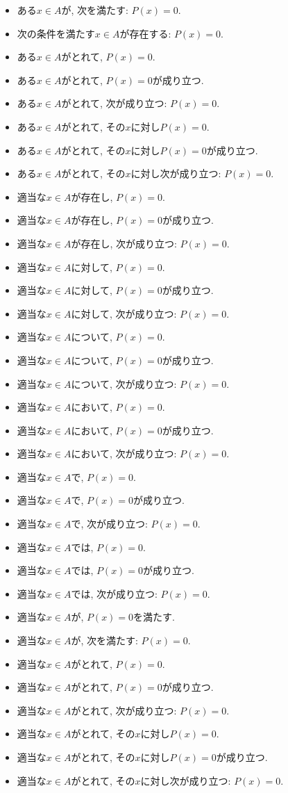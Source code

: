 \documentclass[a4paper,12pt,draft]{amsart}
\newcommand{\PPP}[1]{P(#1)=0}
\begin{document}
\begin{itemize}
\item ある$x\in A$が, 次を満たす: $\PPP{x}$.
\item 次の条件を満たす$x\in A$が存在する: $\PPP{x}$.
\item ある$x\in A$がとれて, $\PPP{x}$.
\item ある$x\in A$がとれて, $\PPP{x}$が成り立つ.
\item ある$x\in A$がとれて, 次が成り立つ: $\PPP{x}$.
\item ある$x\in A$がとれて, その$x$に対し$\PPP{x}$.
\item ある$x\in A$がとれて, その$x$に対し$\PPP{x}$が成り立つ.
\item ある$x\in A$がとれて, その$x$に対し次が成り立つ: $\PPP{x}$.
\item 適当な$x\in A$が存在し, $\PPP{x}$.
\item 適当な$x\in A$が存在し, $\PPP{x}$が成り立つ.
\item 適当な$x\in A$が存在し, 次が成り立つ: $\PPP{x}$.
\item 適当な$x\in A$に対して, $\PPP{x}$.
\item 適当な$x\in A$に対して, $\PPP{x}$が成り立つ.
\item 適当な$x\in A$に対して, 次が成り立つ: $\PPP{x}$.
\item 適当な$x\in A$について, $\PPP{x}$.
\item 適当な$x\in A$について, $\PPP{x}$が成り立つ.
\item 適当な$x\in A$について, 次が成り立つ: $\PPP{x}$.
\item 適当な$x\in A$において, $\PPP{x}$.
\item 適当な$x\in A$において, $\PPP{x}$が成り立つ.
\item 適当な$x\in A$において, 次が成り立つ: $\PPP{x}$.
\item 適当な$x\in A$で, $\PPP{x}$.
\item 適当な$x\in A$で, $\PPP{x}$が成り立つ.
\item 適当な$x\in A$で, 次が成り立つ: $\PPP{x}$.
\item 適当な$x\in A$では, $\PPP{x}$.
\item 適当な$x\in A$では, $\PPP{x}$が成り立つ.
\item 適当な$x\in A$では, 次が成り立つ: $\PPP{x}$.
\item 適当な$x\in A$が, $\PPP{x}$を満たす.
\item 適当な$x\in A$が, 次を満たす: $\PPP{x}$.
\item 適当な$x\in A$がとれて, $\PPP{x}$.
\item 適当な$x\in A$がとれて, $\PPP{x}$が成り立つ.
\item 適当な$x\in A$がとれて, 次が成り立つ: $\PPP{x}$.
\item 適当な$x\in A$がとれて, その$x$に対し$\PPP{x}$.
\item 適当な$x\in A$がとれて, その$x$に対し$\PPP{x}$が成り立つ.
\item 適当な$x\in A$がとれて, その$x$に対し次が成り立つ: $\PPP{x}$.
\end{itemize}
\end{document}
